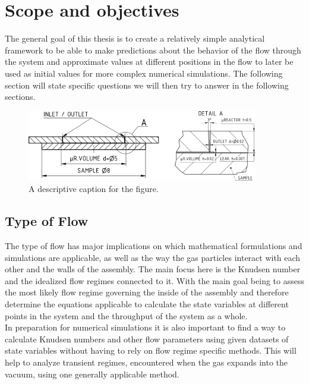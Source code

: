 \newpage

\section{Scope and objectives}

The general goal of this thesis is to create a relatively simple analytical framework to be able to make predictions about the behavior of the flow through the system and approximate values at different positions in the flow to later be used as initial values for more complex numerical simulations.
The following section will state specific questions we will then try to answer in the following sections.

\begin{figure}[H]
    \centering
    \includegraphics[width=0.9\textwidth]{src/02_scope-and-objectives/fig_technical-drawing.png}
    \caption{A descriptive caption for the figure.}
    \label{fig:technical-drawing}
\end{figure}
	
\subsection{Type of Flow}

The type of flow has major implications on which mathematical formulations and simulations are applicable, as well as the way the gas particles interact with each other and the walls of the assembly. 
The main focus here is the Knudsen number and the idealized flow regimes connected to it.
With the main goal being to assess the most likely flow regime governing the inside of the assembly and therefore determine the equations applicable to calculate the state variables at different points in the system and the throughput of the system as a whole.\\
In preparation for numerical simulations it is also important to find a way to calculate Knudsen numbers and other flow parameters using given datasets of state variables without having to rely on flow regime specific methods. This will help to analyze transient regimes, encountered when the gas expands into the vacuum, using one generally applicable method.  

